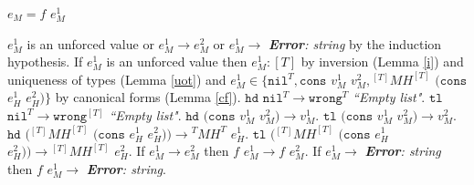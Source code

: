 \begin{case}

$e_{M}=f$ $e_{M}^{1}$

$e_{M}^{1}$ is an unforced value or $e_{M}^{1}\rightarrow e_{M}^{2}$ or $e_{M}^{1}\rightarrow$ \emph{\textbf{Error}: string} by the induction hypothesis.  If $e_{M}^{1}$ is an unforced value then $e_{M}^{1}:[T]$ by inversion (Lemma \ref{i}) and uniqueness of types (Lemma \ref{uot}) and $e_{M}^{1}\in\lbrace\mathtt{nil}^{T},\mathtt{cons}$ $v_{M}^{1}$ $v_{M}^{2},{^{[T]}M}H^{[T]}$ $(\mathtt{cons}$ $e_{H}^{1}$ $e_{H}^{2})\rbrace$ by canonical forms (Lemma \ref{cf}).  $\mathtt{hd}$ $\mathtt{nil}^{T}\rightarrow\mathtt{wrong}^{T}$ \emph{``Empty list"}.  $\mathtt{tl}$ $\mathtt{nil}^{T}\rightarrow\mathtt{wrong}^{[T]}$ \emph{``Empty list"}.  $\mathtt{hd}$ $(\mathtt{cons}$ $v_{M}^{1}$ $v_{M}^{2})\rightarrow v_{M}^{1}$.  $\mathtt{tl}$ $(\mathtt{cons}$ $v_{M}^{1}$ $v_{M}^{2})\rightarrow v_{M}^{2}$.  $\mathtt{hd}$ $({^{[T]}M}H^{[T]}$ $(\mathtt{cons}$ $e_{H}^{1}$ $e_{H}^{2}))\rightarrow{^{T}M}H^{T}$ $e_{H}^{1}$.  $\mathtt{tl}$ $({^{[T]}M}H^{[T]}$ $(\mathtt{cons}$ $e_{H}^{1}$ $e_{H}^{2}))\rightarrow{^{[T]}M}H^{[T]}$ $e_{H}^{2}$.  If $e_{M}^{1}\rightarrow e_{M}^{2}$ then $f$ $e_{M}^{1}\rightarrow f$ $e_{M}^{2}$.  If $e_{M}^{1}\rightarrow$ \emph{\textbf{Error}: string} then $f$ $e_{M}^{1}\rightarrow$ \emph{\textbf{Error}: string}.

\end{case}